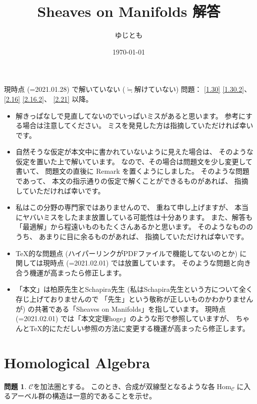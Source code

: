 \documentclass[uplatex,dvipdfmx]{jsarticle}
\title{Sheaves on Manifolds 解答}
\author{ゆじとも}
\date{\today}
\theoremstyle{definition}
\newtheorem{prob}[prob]{問題}
\DeclareMathOperator{\Hom}{\mathrm{Hom}}
\newcommand\mcC{\mathcal{C}}
\begin{document}
\maketitle
\setcounter{subsection}{-1}


現時点 (=2021.01.28) で解いていない (\(\fallingdotseq\)解けていない) 問題：
\autoref{1.30} \ref{1.30.2}、\autoref{2.16} \ref{2.16.2}、
\autoref{2.21} 以降。


\begin{itemize}
  \item
  解きっぱなしで見直してないのでいっぱいミスがあると思います。
  参考にする場合は注意してください。
  ミスを発見した方は指摘していただければ幸いです。
  \item
  自然そうな仮定が本文中に書かれていないように見えた場合は、
  そのような仮定を置いた上で解いています。
  なので、その場合は問題文を少し変更して書いて、
  問題文の直後に Remark を置くようにしました。
  そのような問題であって、
  本文の指示通りの仮定で解くことができるものがあれば、
  指摘していただければ幸いです。
  \item
  私はこの分野の専門家ではありませんので、
  重ねて申し上げますが、
  本当にヤバいミスをしたまま放置している可能性は十分あります。
  また、解答も「最適解」から程遠いものもたくさんあるかと思います。
  そのようなもののうち、
  あまりに目に余るものがあれば、
  指摘していただければ幸いです。
  \item
  TeX的な問題点 (ハイパーリンクがPDFファイルで機能してないのとか)
  に関しては現時点 (=2021.02.01) では放置しています。
  そのような問題と向き合う機運が高まったら修正します。
  \item
  「本文」は柏原先生とSchapira先生
  (私はSchapira先生という方について全く存じ上げておりませんので
  「先生」という敬称が正しいものかわかりませんが)
  の共著である「Sheaves on Manifolds」を指しています。
  現時点 (=2021.02.01) では「本文定理hoge」のような形で参照していますが、
  ちゃんとTeX的にただしい参照の方法に変更する機運が高まったら修正します。
\end{itemize}



\newpage

\section{Homological Algebra}


\begin{prob}\label{prob: 1.1}
  \(\mcC\)を加法圏とする。
  このとき、合成が双線型となるような各\(\Hom_{\mcC}\)に入るアーベル群の構造は一意的であることを示せ。
\end{prob}
\end{document}
